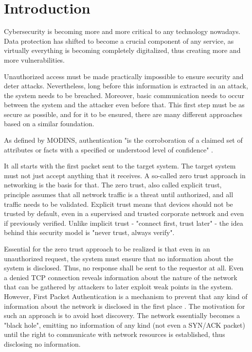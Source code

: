 \section{Introduction}
\label{sec:introduction}

Cybersecurity is becoming more and more critical to any technology nowadays.  Data protection has shifted to become a crucial component of any service, as virtually everything is becoming completely digitalized, thus creating more and more vulnerabilities.\par

Unauthorized access must be made practically impossible to ensure security and deter attacks.  Nevertheless, long before this information is extracted in an attack, the system needs to be breached.  Moreover, basic communication needs to occur between the system and the attacker even before that.  This first step must be as secure as possible, and for it to be ensured, there are many different approaches based on a similar foundation.\\\par

As defined by MODINS, authentication "is the corroboration of a claimed set of attributes or facts with a specified or understood level of confidence" \cite{modins}. \par

It all starts with the first packet sent to the target system.  The target system must not just accept anything that it receives.  A so-called zero trust approach in networking is the basis for that.  The zero trust, also called explicit trust, principle assumes that all network traffic is a threat until authorized, and all traffic needs to be validated.  Explicit trust means that devices should not be trusted by default, even in a supervised and trusted corporate network and even if previously verified.  Unlike implicit trust - "connect first, trust later" - the idea behind this security model is "never trust, always verify".\par

Essential for the zero trust approach to be realized is that even in an unauthorized request, the system must ensure that no information about the system is disclosed.  Thus, no response shall be sent to the requestor at all.  Even a denied TCP connection reveals information about the nature of the network that can be gathered by attackers to later exploit weak points in the system.  However, First Packet Authentication is a mechanism to prevent that any kind of information about the network is disclosed in the first place \cite{7796146}.  The motivation for such an approach is to avoid host discovery.  The network essentially becomes a "black hole", emitting no information of any kind (not even a SYN/ACK packet) until the right to communicate with network resources is established, thus disclosing no information.\\\par

